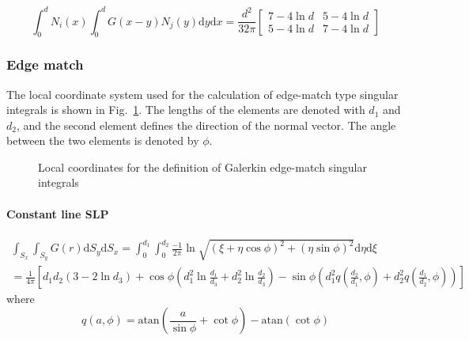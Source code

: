 \documentclass[a4paper,11pt]{article}
\newcommand{\td}{\mathrm{d}}
\newcommand{\atan}{\mathrm{atan}}
\begin{document}
\begin{equation}
\int_{0}^{d} N_i(x) \int_{0}^{d} G(x-y) N_j(y) \td y \td x
=
\frac{d^2}{32\pi} \begin{bmatrix}
7-4 \ln d & 5 - 4 \ln d \\
5-4 \ln d & 7 - 4 \ln d
\end{bmatrix}
\end{equation}

\subsubsection{Edge match}

The local coordinate system used for the calculation of edge-match type singular integrals is shown in Fig.~\ref{fig:local_galerkin_edge}. The lengths of the elements are denoted with $d_1$ and $d_2$, and the second element defines the direction of the normal vector. The angle between the two elements is denoted by $\phi$.

\begin{figure}
\center
{}
\caption{Local coordinates for the definition of Galerkin edge-match singular integrals}
\label{fig:local_galerkin_edge}
\end{figure}

\paragraph{Constant line SLP}

\begin{multline}
\int_{S_{x}} \int_{S_{y}} G(r) \td S_y \td S_x =
\int_{0}^{d_1} \int_{0}^{d_2}
\frac{-1}{2\pi}\ln \sqrt{(\xi+\eta \cos\phi)^2 + (\eta\sin\phi)^2}
\td \eta \td \xi \\
=
\frac{1}{4 \pi}
\left[
d_1 d_2 \left(3 - 2 \ln d_3 \right)
+ \cos\phi \left(d_1^2 \ln \frac{d_1}{d_3} + d_2^2 \ln \frac{d_2}{d_3}\right)
- \sin\phi \left(d_1^2 q\left(\frac{d_2}{d_1}, \phi\right) + d_2^2 q\left(\frac{d_1}{d_2}, \phi\right)\right)
\right]
\end{multline}
%
where
%
\begin{equation}
q(a, \phi) = \atan\left(\frac{a}{\sin\phi} + \cot\phi\right) - \atan\left(\cot\phi\right)
\end{equation}
\end{document}
